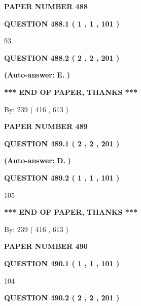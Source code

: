\documentclass[12pt]{article}
\begin{document}
   
\newpage 
\setcounter{page}{ 
   488001 } 
   
   
 {\textbf{ \Large{ PAPER NUMBER  488  }}}
   
   
   
   
  
  
{\textbf{\large{QUESTION
488.1 
 ( 1 , 1 , 101 )
}}}

93
  
  
{\textbf{\large{QUESTION
488.2 
 ( 2 , 2 , 201 )
}}}
 
 
{\textbf{(Auto-answer:}}
{\textbf{\large{
E.}}}
{\textbf{)}}
 
 
   
   
   
   
\vspace{1.0in} 
{\textbf{\large{ *** END OF PAPER, THANKS *** }}} 
   
   
\hspace{1.0in} By: 
 239 ( 416 ,  613 )
   
   
   
   
\newpage 
\setcounter{page}{ 
   489001 } 
   
   
 {\textbf{ \Large{ PAPER NUMBER  489  }}}
   
   
   
   
  
  
{\textbf{\large{QUESTION
489.1 
 ( 2 , 2 , 201 )
}}}
 
 
{\textbf{(Auto-answer:}}
{\textbf{\large{
D.}}}
{\textbf{)}}
 
 
  
  
{\textbf{\large{QUESTION
489.2 
 ( 1 , 1 , 101 )
}}}

105
   
   
   
   
\vspace{1.0in} 
{\textbf{\large{ *** END OF PAPER, THANKS *** }}} 
   
   
\hspace{1.0in} By: 
 239 ( 416 ,  613 )
   
   
   
   
\newpage 
\setcounter{page}{ 
   490001 } 
   
   
 {\textbf{ \Large{ PAPER NUMBER  490  }}}
   
   
   
   
  
  
{\textbf{\large{QUESTION
490.1 
 ( 1 , 1 , 101 )
}}}

104
  
  
{\textbf{\large{QUESTION
490.2 
 ( 2 , 2 , 201 )
}}}
 
\end{document}

